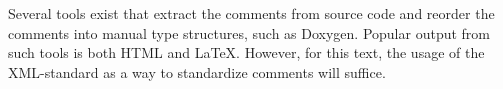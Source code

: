 \documentclass[fsharpNotes.tex]{subfiles}
\begin{document}

Several tools exist that extract the comments from source code and reorder the comments into manual type structures, such as Doxygen. Popular output from such tools is both HTML and \LaTeX. However, for this text, the usage of the XML-standard as a way to standardize comments will suffice.
\end{document}
